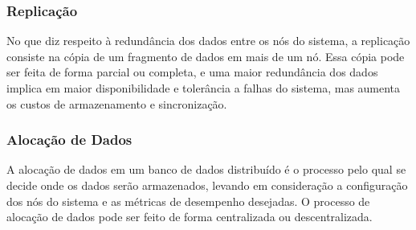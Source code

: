 \subsubsection{Replicação}
No que diz respeito à redundância dos dados entre os nós do sistema, a replicação consiste na cópia de um fragmento de dados em mais de um nó. Essa cópia pode ser feita de forma parcial ou completa, e uma maior redundância dos dados implica em maior disponibilidade e tolerância a falhas do sistema, mas aumenta os custos de armazenamento e sincronização.




\subsubsection{Alocação de Dados}
A alocação de dados em um banco de dados distribuído é o processo pelo qual se decide onde os dados serão armazenados, levando em consideração a configuração dos nós do sistema e as métricas de desempenho desejadas. O processo de alocação de dados pode ser feito de forma centralizada ou descentralizada.



